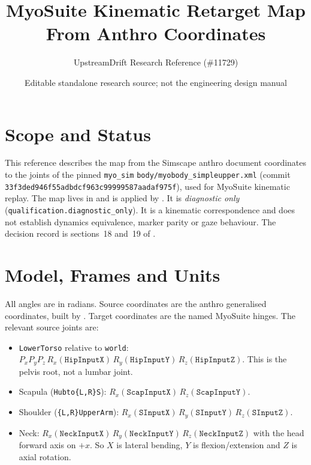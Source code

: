 \documentclass[11pt,a4paper]{article}
\title{MyoSuite Kinematic Retarget Map From Anthro Coordinates}
\author{UpstreamDrift Research Reference (\#11729)}
\date{Editable standalone research source; not the engineering design manual}
\begin{document}
\maketitle

\section{Scope and Status}

This reference describes the map from the Simscape anthro document
coordinates to the joints of the pinned \texttt{myo\_sim}
\texttt{body/myobody\_simpleupper.xml} (commit
\texttt{33f3ded946f55adbdcf963c99999587aadaf975f}), used for MyoSuite
kinematic replay. The map lives in
and is applied by
. It is
\emph{diagnostic only} (\texttt{qualification.diagnostic\_only}). It is a
kinematic correspondence and does not establish dynamics equivalence, marker
parity or gaze behaviour. The decision record is sections~18 and~19 of
.

\section{Model, Frames and Units}

All angles are in radians. Source coordinates are the anthro generalised
coordinates, built by
. Target
coordinates are the named MyoSuite hinges. The relevant source joints are:
\begin{itemize}[nosep]
  \item \texttt{LowerTorso} relative to \texttt{world}:
    $P_x P_y P_z\,R_x(\texttt{HipInputX})\,R_y(\texttt{HipInputY})\,R_z(\texttt{HipInputZ})$.
    This is the pelvis root, not a lumbar joint.
  \item Scapula (\texttt{Hubto\{L,R\}S}):
    $R_x(\texttt{ScapInputX})\,R_z(\texttt{ScapInputY})$.
  \item Shoulder (\texttt{\{L,R\}UpperArm}):
    $R_x(\texttt{SInputX})\,R_y(\texttt{SInputY})\,R_z(\texttt{SInputZ})$.
  \item Neck: $R_x(\texttt{NeckInputX})\,R_y(\texttt{NeckInputY})\,R_z(\texttt{NeckInputZ})$
    with the head forward axis on $+x$. So $X$ is lateral bending, $Y$ is
    flexion/extension and $Z$ is axial rotation.
\end{itemize}
\end{document}
